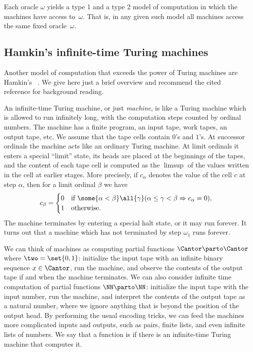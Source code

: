 Each oracle $\omega$ yields a type 1 and a type 2 model of computation in which the machines have access to~$\omega$. That is, in any given such model all machines access the same fixed oracle~$\omega$.


\subsection{Hamkin's infinite-time Turing machines}
\label{sec:iitm}

Another model of computation that exceeds the power of Turing machines are Hamkin's ~. We give here just a brief overview and recommend the cited reference for background reading.

An infinite-time Turing machine, or just \emph{machine}, is like a Turing
machine which is allowed to run infinitely long, with the computation steps
counted by ordinal numbers. The machine has a finite program, an input tape, work
tapes, an output tape, etc. We assume that the tape cells contain $0$'s and
$1$'s. At successor ordinals the machine acts like an ordinary Turing machine.
At limit ordinals it enters a special ``limit'' state, its heads are placed at
the beginnings of the tapes, and the content of each tape cell is computed as
the $\limsup$ of the values written in the cell at earlier stages. More
precisely, if $c_\alpha$ denotes the value of the cell $c$ at step $\alpha$,
then for a limit ordinal $\beta$ we have
%
\begin{equation*}
  c_\beta =
  \begin{cases}
    0 & \text{if $\some{\alpha < \beta} \all{\gamma}
      (\alpha \leq \gamma < \beta \Rightarrow c_\alpha = 0)$},\\
    1 & \text{otherwise}.
  \end{cases}
\end{equation*}
%
The machine terminates by entering a special halt state, or it may run forever. It turns
out that a machine which has not terminated by step $\omega_1$ runs forever.

We can think of machines as computing partial functions $\Cantor \parto \Cantor$ where $\two = \set{0, 1}$:
%
initialize the input tape with an infinite binary sequence $x \in \Cantor$, run the
machine, and observe the contents of the output tape if and when the machine terminates.
We can also consider infinite time computation of partial functions $\NN \parto \NN$:
initialize the input tape with the input number, run the machine, and interpret the
contents of the output tape as a natural number, where we ignore anything that is beyond
the position of the output head. By performing the usual encoding tricks, we can feed the
machines more complicated inputs and outputs, such as pairs, finite lists, and even
infinite lists of numbers. We say that a function is  if there is an infinite-time Turing machine that computes it.

